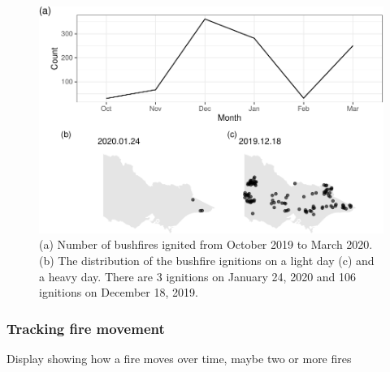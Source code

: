 \begin{Schunk}
\begin{figure}

{\centering \includegraphics[width=0.8\linewidth]{clustering_paper_files/figure-latex/app3-1} 

}

\caption[(a) Number of bushfires ignited from October 2019 to March 2020]{(a) Number of bushfires ignited from October 2019 to March 2020. (b) The distribution of the bushfire ignitions on a light day (c) and a heavy day. There are 3 ignitions on January 24, 2020 and 106 ignitions on December 18, 2019.}\label{fig:app3}
\end{figure}
\end{Schunk}

\hypertarget{tracking-fire-movement}{%
\subsubsection{Tracking fire movement}\label{tracking-fire-movement}}

Display showing how a fire moves over time, maybe two or more fires

